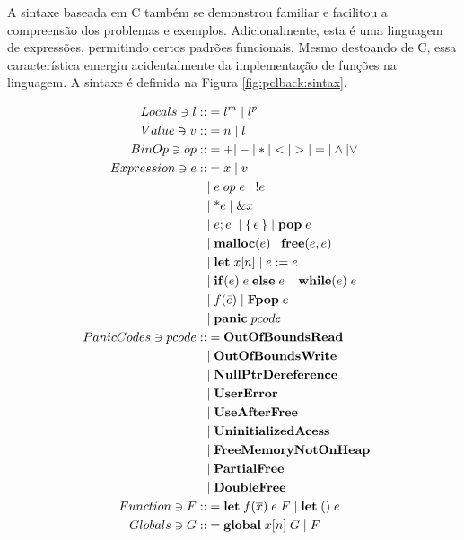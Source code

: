 A sintaxe baseada em C também se demonstrou familiar e facilitou a compreensão dos problemas e exemplos. Adicionalmente, esta é uma linguagem de expressões, permitindo certos padrões funcionais. Mesmo destoando de C, essa característica emergiu acidentalmente da implementação de funções na linguagem. A sintaxe é definida na Figura \ref{fig:pclback:sintax}.
\begin{figure*}[ht]
	\caption{Sintaxe de $PCL_{back}$}
	\label{fig:pclback:sintax}
	\begingroup
		\begin{align*}
			Locals \ni l ::&= l^m \;|\; l^p &&\\ 
			Value \ni v ::&= n \;|\; l && \\
			BinOp \ni op ::&= + | - | * | < | > | = | \land | \lor \\
			Expression \ni e ::&= x \;|\; v \\
			&|\; e\; op\; e \;|\; !e  \\
			&|\; \text{*}e \;|\; \&x \\
			&|\; e;e \; \;|\; \{\,e\,\} \;|\; \mathbf{pop}\;e\; \\ 
			&|\; \mathbf{malloc}(e) \;|\; \mathbf{free}(e, e) \; \\ 
			&|\; \mathbf{let}\; x[n] \;|\; e := e \; \\
			&|\; \mathbf{if}(e) \; e \; \mathbf{else} \; e \; \;|\; \mathbf{while}(e) \; e \\
			&|\; f(\bar e) \;|\; \mathbf{Fpop}\;e\\ 
			&|\; \mathbf{panic}\;pcode \\ 
			PanicCodes \ni pcode ::&= \mathbf{OutOfBoundsRead}\\
			&|\; \mathbf{OutOfBoundsWrite}\\
			&|\; \mathbf{NullPtrDereference}\\
			&|\; \mathbf{UserError}\\
			&|\; \mathbf{UseAfterFree}\\
			&|\; \mathbf{UninitializedAcess}\\
			&|\; \mathbf{FreeMemoryNotOnHeap}\\
			&|\; \mathbf{PartialFree}\\
			&|\; \mathbf{DoubleFree}\\
			Function \ni F ::&= \mathbf{let} \; f(\overline{x})\; e \; F \; | \; \mathbf{let}\;() \; e \\
			Globals \ni G ::&= \mathbf{global}\; x[n] \;G \;|\; F
		\end{align*}
	\endgroup
\end{figure*}
\FloatBarrier

